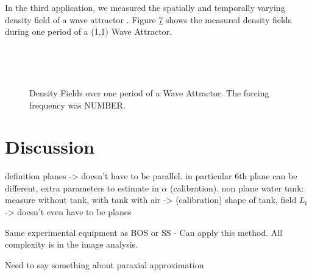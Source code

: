 \documentclass{svjour3}                     %
\begin{document}
In the third application, we measured the spatially and temporally varying density field of a wave attractor \cite{maas1997observation}. Figure \ref{figs:WA0side} shows the measured density fields during one period of a (1,1) Wave Attractor. 
\begin{figure}[htbp]
\begin{subfigure}{.5\linewidth}
		\label{fig:WA0side}
\end{subfigure}%
\begin{subfigure}{.5\linewidth}
		\label{fig:WA6side}
\end{subfigure} \\
\begin{subfigure}{.5\linewidth}
		\label{fig:WA3side}
\end{subfigure}%
\begin{subfigure}{.5\linewidth}
		\label{fig:WA2side}
\end{subfigure} \\
\begin{subfigure}{.5\linewidth}
		\label{fig:WA23side}
\end{subfigure}%
\begin{subfigure}{.5\linewidth}
		\label{fig:WA56side}
\end{subfigure} 
\caption{Density Fields over one period of a Wave Attractor. The forcing frequency was NUMBER. }
\label{figs:WA0side}
\end{figure}


\clearpage
\section{Discussion}
\label{sec:dis}

definition planes -> doesn't have to be parallel. in particular 6th plane can be different, extra parameters to estimate in $\alpha$ (calibration). 
non plane water tank: measure without tank, with tank with air -> (calibration) shape of tank, field $L_t$
-> doesn't even have to be planes

Same experimental equipment as BOS or SS - Can apply this method. All complexity is in the image analysis. 

Need to say something about paraxial approximation
\end{document}
